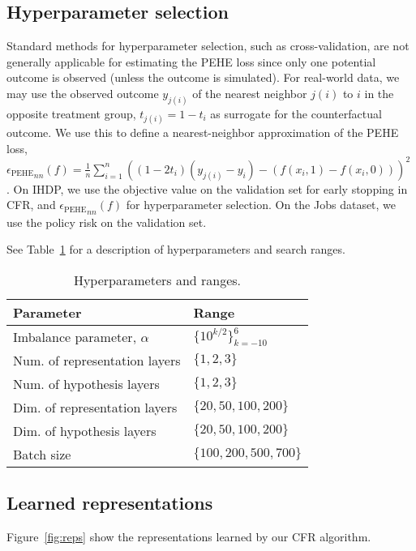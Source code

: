 \documentclass{article}
\def \epehe{\epsilon_{\text{PEHE}}}
\def \epehenn{{\epehe}_{nn}}
\begin{document}
\subsection{Hyperparameter selection}
Standard methods for hyperparameter selection, such as cross-validation, are not generally applicable for estimating the PEHE loss since only one potential outcome is observed (unless the outcome is simulated). For real-world data, we may use the observed outcome $y_{j(i)}$ of the nearest neighbor $j(i)$ to $i$ in the opposite treatment group, $t_{j(i)} = 1 - t_i$ as surrogate for the counterfactual outcome. We use this to define a nearest-neighbor approximation of the PEHE loss, $\epehenn(f) = \frac{1}{n}\sum_{i=1}^n \left((1-2t_i)(y_{j(i)} - y_i) - (f(x_i,1) - f(x_i,0))\right)^2~$. On IHDP, we use the objective value on the validation set for early stopping in CFR, and $\epehenn(f)$ for hyperparameter selection. On the Jobs dataset, we use the policy risk on the validation set.

See Table~\ref{tbl:hypparams} for a description of hyperparameters and search ranges.

\begin{table}[t!]
  \caption{\label{tbl:hypparams}Hyperparameters and ranges.}
  \begin{center}
      \begin{tabular}{ll}
        Parameter & Range \\ \hline
        Imbalance parameter, $\alpha$ & $\{10^{k/2}\}_{k=-10}^6$ \\
        Num. of representation layers & $\{1,2,3\}$ \\
        Num. of hypothesis layers & $\{1,2,3\}$ \\
        Dim. of representation layers & $\{20, 50, 100, 200\}$ \\
        Dim. of hypothesis layers & $\{20, 50, 100, 200\}$ \\
        Batch size & $\{100, 200, 500, 700\}$ \\
        \hline
      \end{tabular}
    \end{center}
\end{table}

\subsection{Learned representations}
Figure~\ref{fig:reps} show the representations learned by our CFR algorithm.
\end{document}
